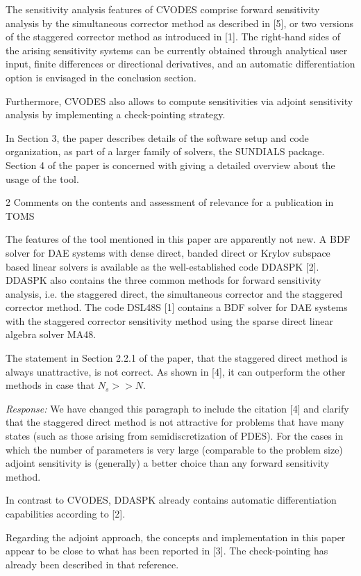 The sensitivity analysis features of CVODES comprise forward
sensitivity analysis by the simultaneous corrector method as described
in [5], or two versions of the staggered corrector method as
introduced in [1]. The right-hand sides of the arising sensitivity
systems can be currently obtained through analytical user input,
finite differences or directional derivatives, and an automatic
differentiation option is envisaged in the conclusion section.

Furthermore, CVODES also allows to compute sensitivities via adjoint
sensitivity analysis by implementing a check-pointing strategy.

In Section 3, the paper describes details of the software setup and
code organization, as part of a larger family of solvers, the SUNDIALS
package.  Section 4 of the paper is concerned with giving a detailed
overview about the usage of the tool.

2 Comments on the contents and assessment of relevance for a
publication in TOMS

The features of the tool mentioned in this paper are apparently not
new. A BDF solver for DAE systems with dense direct, banded direct or
Krylov subspace based linear solvers is available as the
well-established code DDASPK [2]. DDASPK also contains the three
common methods for forward sensitivity analysis, i.e. the staggered
direct, the simultaneous corrector and the staggered corrector
method. The code DSL48S [1] contains a BDF solver for DAE systems with
the staggered corrector sensitivity method using the sparse direct
linear algebra solver MA48.

The statement in Section 2.2.1 of the paper, that the staggered direct
method is always unattractive, is not correct. As shown in [4], it can
outperform the other methods in case that $N_s >> N$.

{\em Response:}
We have changed this paragraph to include the citation [4] and 
clarify that the staggered direct method is not attractive for problems that 
have many states (such as those arising from semidiscretization of PDES).
For the cases in which the number of parameters is very large (comparable
to the problem size) adjoint sensitivity is (generally) a better choice than 
any forward sensitivity method.

In contrast to CVODES, DDASPK already contains automatic
differentiation capabilities according to [2].

Regarding the adjoint approach, the concepts and implementation in
this paper appear to be close to what has been reported in [3]. The
check-pointing has already been described in that reference.

